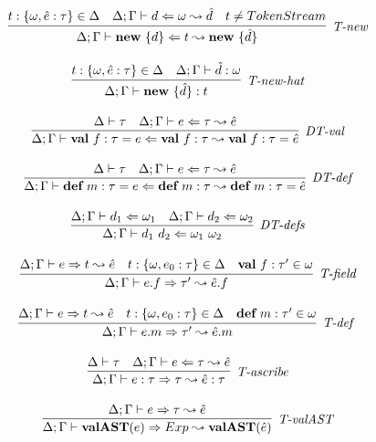 \begin{figure}
\centering
\[
\begin{array}{c}

\infer[\textit{T-new}]
	{\Delta; \Gamma \vdash \keyw{new}\ \{ d \} \Leftarrow  t \leadsto \keyw{new}\ \{\hat d\}}
	{ t:\{\omega, \hat e:\tau\} \in \Delta & \Delta;\Gamma \vdash d \Leftarrow \omega \leadsto \hat d & t\neq TokenStream} \\[3ex]

\infer[\textit{T-new-hat}]
	{\Delta; \Gamma \vdash \keyw{new}\ \{ \hat d \} :  t }
	{ t:\{\omega, \hat e:\tau\} \in \Delta & \Delta;\Gamma \vdash \hat d : \omega} \\[3ex]


\infer[\textit{DT-val}]
	{\Delta; \Gamma \vdash \keyw{val}~ f:\tau = e \Leftarrow \keyw{val}~ f:\tau  \leadsto \keyw{val}~ f:\tau = \hat{e}}
	{\Delta \vdash \tau &\Delta; \Gamma \vdash e \Leftarrow \tau \leadsto \hat{e} } \\[3ex]
	
\infer[\textit{DT-def}]
	{\Delta; \Gamma \vdash \keyw{def}~ m:\tau = e \Leftarrow \keyw{def}~ m:\tau \leadsto \keyw{def}~ m:\tau = \hat{e} }
	{\Delta \vdash \tau  & \Delta; \Gamma \vdash e  \Leftarrow \tau \leadsto \hat{e} } \\[3ex]

	
\infer[\textit{DT-defs}]
	{\Delta; \Gamma \vdash d_1\ d_2 \Leftarrow \omega_1\ \omega_2 }
	{\Delta; \Gamma \vdash d_1 \Leftarrow \omega_1 &  \Delta; \Gamma \vdash d_2 \Leftarrow \omega_2 } \\[3ex]


\infer[\textit{T-field}]
	{\Delta; \Gamma \vdash  e.f \Rightarrow \tau' \leadsto \hat{e}.f} 
	{\Delta; \Gamma \vdash e \Rightarrow t \leadsto \hat{e} & t:\{\omega, e_0:\tau\}\in \Delta & \keyw{val}\ f:\tau' \in \omega  }\\[3ex]

 
\infer[\textit{T-def }]
	{\Delta; \Gamma \vdash  e.m \Rightarrow \tau' \leadsto \hat{e}.m} 
	{\Delta; \Gamma \vdash e \Rightarrow t \leadsto \hat{e} & t: \{\omega, e_0:\tau\} \in \Delta & \keyw{def}\ m:\tau' \in \omega }\\[3ex]

\infer[\textit{T-ascribe}]
	{\Delta; \Gamma  \vdash  e:\tau \Rightarrow \tau \leadsto \hat{e}:\tau}
	{\Delta \vdash \tau & \Delta; \Gamma \vdash e \Leftarrow \tau \leadsto \hat{e} } \\[3ex]

\infer[\textit{T-valAST}]
        {\Delta; \Gamma \vdash \keyw{valAST}(e) \Rightarrow Exp \leadsto \keyw{valAST}(\hat{e}) }
	{\Delta; \Gamma \vdash e \Rightarrow \tau \leadsto \hat{e}} \\[3ex]


\end{array}\]
\end{figure}
